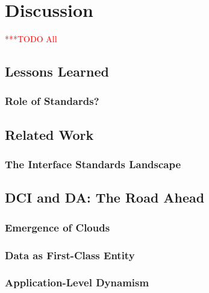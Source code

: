 \documentclass[a4paper,10pt]{article}
\newcommand{\todo}[1]{     {\textcolor{red}  { ***TODO      #1 }}}
\newcommand{\todo}[1]{}
\begin{document}
\section{Discussion}\todo{All}

\subsection{Lessons Learned}

\subsubsection{Role of Standards?}

\subsection{Related Work}

\subsubsection{The Interface Standards Landscape}\label{interface_landscape}

\subsection{DCI and DA: The Road Ahead}

\subsubsection{Emergence of Clouds}

\subsubsection{Data as First-Class Entity}

\subsubsection{Application-Level Dynamism}

 
\end{document}
